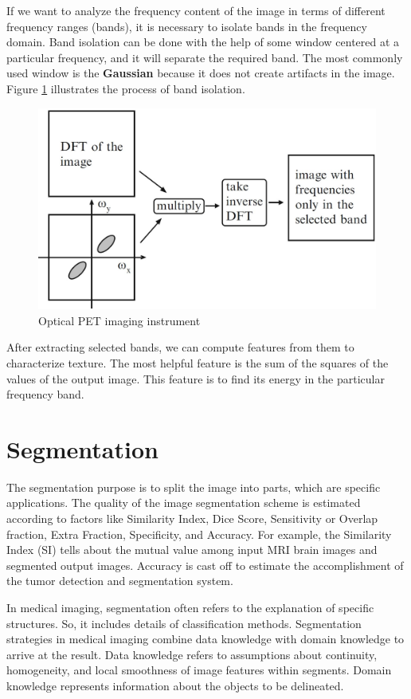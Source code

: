 If we want to analyze the frequency content of the image in terms of different frequency ranges (bands), it is necessary to isolate bands in the frequency domain. Band isolation can be done with the help of some window centered at a particular frequency, and it will separate the required band. The most commonly used window is the \textbf{Gaussian} because it does not create artifacts in the image. Figure \ref{fig15} illustrates the process of band isolation.

\begin{figure}[htbp]
	\centering \includegraphics[width=0.6\columnwidth]{./figures/Fig15.jpg}
	\caption{Optical PET imaging instrument}
	\label{fig15}
\end{figure}

After extracting selected bands, we can compute features from them to characterize texture. The most helpful feature is the sum of the squares of the values of the output image. This feature is to find its energy in the particular frequency band.


\section{Segmentation}

The segmentation purpose is to split the image into parts, which are specific applications. The quality of the image segmentation scheme is estimated according to factors like Similarity Index, Dice Score, Sensitivity or Overlap fraction, Extra Fraction, Specificity, and Accuracy. For example, the Similarity Index (SI) tells about the mutual value among input MRI brain images and segmented output images. Accuracy is cast off to estimate the accomplishment of the tumor detection and segmentation system.

In medical imaging, segmentation often refers to the explanation of specific structures. So, it includes details of classification methods. Segmentation strategies in medical imaging combine data knowledge with domain knowledge to arrive at the result. Data knowledge refers to assumptions about continuity, homogeneity, and local smoothness of image features within segments. Domain knowledge represents information about the objects to be delineated.


